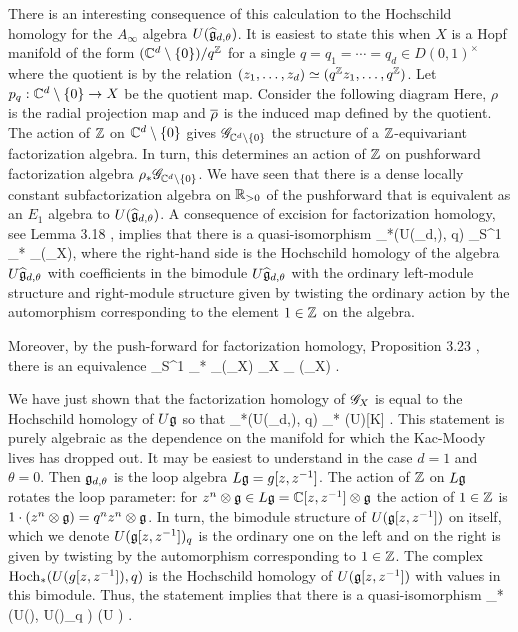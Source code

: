 There is an interesting consequence of this calculation to the Hochschild homology for the $A_\infty$ algebra $U(\Hat{\fg}_{d,\theta})$.
It is easiest to state this when $X$ is a Hopf manifold of the form $(\CC^d \setminus \{0\}) / q^\ZZ$ for a single $q =q_1=\cdots=q_d \in D(0,1)^\times$ where the quotient is by the relation $(z_1,\ldots,z_d) \simeq (q^\ZZ z_1,\ldots,q^\ZZ)$.
Let $p_q :  \CC^d \setminus \{0\} \to X$ be the quotient map.
Consider the following diagram
\ben
{}
\een
Here, $\rho$ is the radial projection map and $\Bar{\rho}$ is the induced map defined by the quotient.
The action of $\ZZ$ on $\CC^d \setminus\{0\}$ gives $\sG_{\CC^d \setminus \{0\}}$ the structure of a $\ZZ$-equivariant factorization algebra. 
In turn, this determines an action of $\ZZ$ on pushforward factorization algebra $\rho_* \sG_{\CC^d \setminus \{0\}}$.
We have seen that there is a dense locally constant subfactorization algebra on $\RR_{>0}$ of the pushforward that is equivalent as an $E_1$ algebra to $U(\Hat{\fg}_{d,\theta})$.
A consequence of excision for factorization homology, see Lemma 3.18 \cite{AFTopMan}, implies that there is a quasi-isomorphism
\ben
\Hoch_*(U(\Hat{\fg}_{d,\theta}), q) \simeq \int_{S^1} \Bar{\rho}_* \UU_\alpha(\sG_X),
\een
where the right-hand side is the Hochschild homology of the algebra $U \Hat{\fg}_{d,\theta}$ with coefficients in the bimodule $U \Hat{\fg}_{d, \theta}$ with the ordinary left-module structure and right-module structure given by twisting the ordinary action by the automorphism corresponding to the element $1 \in \ZZ$ on the algebra.

Moreover, by the push-forward for factorization homology, Proposition 3.23 \cite{AFTopMan}, there is an equivalence
\ben
\int_{S^1} \Bar{\rho}_* \UU_\alpha(\sG_X) \xto{\simeq} \int_X \UU_{\alpha} (\sG_X) .
\een

We have just shown that the factorization homology of $\sG_X$ is equal to the Hochschild homology of $U\fg$ so that
\ben
\Hoch_*(U(\Hat{\fg}_{d,\theta}), q) \simeq \Hoch_* (U\fg)[K] .
\een
This statement is purely algebraic as the dependence on the manifold for which the Kac-Moody lives has dropped out.
It may be easiest to understand in the case $d=1$ and $\theta = 0$. 
Then $\fg_{d,\theta}$ is the loop algebra $L\fg = g [z,z^{-1}]$. 
The action of $\ZZ$ on $L\fg$ rotates the loop parameter: for $z^n \tensor \fg \in L \fg = \CC[z,z^{-1}] \tensor \fg$ the action of $1 \in \ZZ$ is $1 \cdot (z^n \tensor \fg) = q^n z^n \tensor \fg$. 
In turn, the bimodule structure of $U(\fg[z,z^{-1}])$ on itself, which we denote $U(\fg[z,z^{-1}])_q$ is the ordinary one on the left and on the right is given by twisting by the automorphism corresponding to $1 \in \ZZ$. 
The complex $\Hoch_*(U(g[z,z^{-1}]), q)$ is the Hochschild homology of $U(\fg[z,z^{-1}])$ with values in this bimodule.
Thus, the statement implies that there is a quasi-isomorphism
\ben
\Hoch_*\left(U(\fg[z,z^{-1}]), U(\fg[z,z^{-1}])_q \right) \simeq \Hoch(U \fg) . 
\een

